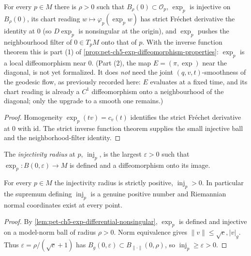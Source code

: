 \begin{lemma}
  \label{lem:pet-ch5-exp-differential-nonsingular}
  \leanok
  For every $p\in M$ there is $\rho>0$ such that $B_\rho(0)\subset\mathcal O_p$,
  $\exp_p$ is injective on $B_\rho(0)$, its chart reading $w\mapsto\varphi_p(\exp_p
  w)$ has strict Fréchet derivative the identity at $0$ (so $D\exp_p$ is nonsingular
  at the origin), and $\exp_p$ pushes the neighbourhood filter of $0\in T_pM$ onto
  that of $p$.  With the inverse function theorem this is part (1) of
  \cref{prop:pet-ch5-exp-diffeomorphism-properties}: $\exp_p$ is a local
  diffeomorphism near $0$.  (Part (2), the map $E=(\pi,\exp)$ near the diagonal, is
  not yet formalized.  It does \emph{not} need the joint $(q,v,t)$-smoothness of the
  geodesic flow, as previously recorded here: $E$ evaluates at a fixed time, and its
  chart reading is already a $C^1$ diffeomorphism onto a neighbourhood of the
  diagonal; only the upgrade to a smooth one remains.)
\end{lemma}
\begin{proof}
  \leanok
  \sketch
  Homogeneity $\exp_p(tv)=c_v(t)$ identifies the strict Fréchet derivative at
  $0$ with $\mathrm{id}$.  The strict inverse function theorem supplies the small
  injective ball and the neighborhood-filter identity.
\end{proof}

\begin{definition}
  \label{def:pet-ch5-injectivity-radius}
  \leanok
  The \emph{injectivity radius} at $p$, $\operatorname{inj}_p$, is the largest
  $\varepsilon>0$ such that $\exp_p:B(0,\varepsilon)\to M$ is defined and a
  diffeomorphism onto its image.
\end{definition}

\begin{lemma}
  \label{lem:pet-ch5-injectivity-radius-positive}
  \leanok
  For every $p\in M$ the injectivity radius is strictly positive,
  $\operatorname{inj}_p>0$. In particular the supremum defining $\operatorname{inj}_p$
  is a genuine positive number and Riemannian normal coordinates exist at every point.
\end{lemma}
\begin{proof}
  \leanok
  \sketch
  By \cref{lem:pet-ch5-exp-differential-nonsingular}, $\exp_p$ is defined and
  injective on a model-norm ball of radius $\rho>0$.  Norm equivalence gives
  $\|v\|\le\sqrt c,|v|_g$.  Thus
  $\varepsilon=\rho/(\sqrt c+1)$ has
  $B_g(0,\varepsilon)\subset B_{\|\cdot\|}(0,\rho)$, so
  $\operatorname{inj}_p\ge\varepsilon>0$.
\end{proof}

